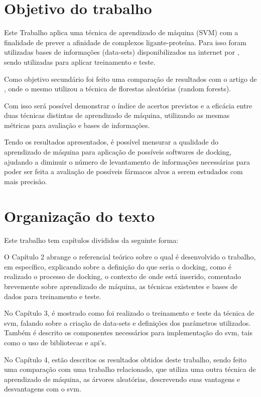 \documentclass[tcc, capa]{texucpel}
\begin{document}
\section{Objetivo do trabalho}

Este Trabalho aplica uma técnica de aprendizado de máquina (SVM) com a finalidade de prever a afinidade de complexos ligante-proteína. Para isso foram utilizadas bases de informações (data-sets) disponibilizados na internet por \cite{wang2004pdbbind}, sendo utilizadas para aplicar treinamento e teste. 

Como objetivo secundário foi feito uma comparação de resultados com o artigo de \cite{ballester2010machine}, onde o mesmo utilizou a técnica de florestas aleatórias (random forests).

Com isso será possível demonstrar o índice de acertos previstos e a eficácia entre duas técnicas distintas  de aprendizado de máquina, utilizando as mesmas métricas para avaliação e bases de informações.

Tendo os resultados apresentados, é possível mensurar a qualidade do aprendizado de máquina para aplicação de possíveis softwares de docking,  ajudando a diminuir o número de levantamento de informações necessárias para poder ser feita a  avaliação de possíveis fármacos alvos a serem estudados com mais precisão.

\section{Organização do texto}
Este trabalho tem capítulos divididos da seguinte forma:

O Capítulo 2 abrange o referencial teórico sobre o qual é desenvolvido o trabalho, em específico, explicando sobre a definição do que seria o docking, como é realizado o processo de docking, o contexto de onde está inserido, comentado brevemente sobre aprendizado de máquina, as técnicas existentes e bases de dados para treinamento e teste.

No Capítulo 3, é mostrado como foi realizado o treinamento e teste da técnica de svm, falando sobre a criação de data-sets e definições dos parâmetros utilizados. Também é descrito os componentes necessários para implementação do svm, tais como o uso de bibliotecas e api's.

No Capítulo 4, estão descritos os resultados obtidos deste trabalho, sendo feito uma comparação com uma trabalho relacionado, que utiliza uma outra técnica de aprendizado de máquina, as árvores aleatórias, descrevendo suas vantagens e desvantagens com o svm.
\end{document}
